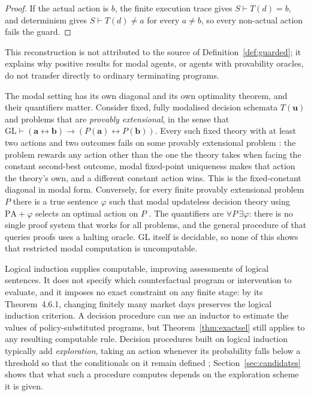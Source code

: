 \begin{proof}
If the actual action is $b$, the finite execution trace gives $S\vdash T(d)=b$, and determinism gives
$S\vdash T(d)\neq a$ for every $a\ne b$, so every non-actual action fails the guard.
\end{proof}

This reconstruction is not attributed to the source of Definition~\ref{def:guarded}; it explains
why positive results for modal agents, or agents with provability oracles, do not transfer directly
to ordinary terminating programs.

The modal setting has its own diagonal and its own optimality theorem, and their quantifiers matter.
Consider fixed, fully modalised decision schemata $T(\mathbf u)$ and problems that are \emph{provably
extensional}, in the sense that $\mathrm{GL}\vdash(\mathbf a\leftrightarrow\mathbf b)\to
(P(\mathbf a)\leftrightarrow P(\mathbf b))$. Every such fixed theory with at least two actions and
two outcomes fails on some provably extensional problem \autocite{fallenstein2014evil}: the problem
rewards any action other than the one the theory takes when facing the constant second-best outcome,
modal fixed-point uniqueness makes that action the theory's own, and a different constant action
wins. This is the fixed-constant diagonal in modal form. Conversely, for every finite provably
extensional problem $P$ there is a true sentence $\varphi$ such that modal updateless decision theory
using $\mathrm{PA}+\varphi$ selects an optimal action on $P$
\autocite{fallenstein2014optimality,fallenstein2014improving}. The quantifiers are
$\forall P\,\exists\varphi$: there is no single proof system that works for all problems, and the
general procedure of \textcite{soaresfallenstein2015} that queries proofs uses a halting oracle. $\mathrm{GL}$
itself is decidable, so none of this shows that restricted modal computation is uncomputable.

Logical induction \autocite{garrabrant2016li} supplies computable, improving assessments of logical
sentences. It does not specify which counterfactual program or intervention to evaluate, and it
imposes no exact constraint on any finite stage: by its Theorem~4.6.1, changing finitely many market
days preserves the logical induction criterion. A decision procedure can use an inductor to estimate
the values of policy-substituted programs, but Theorem~\ref{thm:exactsel} still applies to any
resulting computable rule. Decision procedures built on logical induction typically add
\emph{exploration}, taking an action whenever its probability falls below a threshold so that the
conditionals on it remain defined \autocite{garrabrant2017obstacles}; Section~\ref{sec:candidates}
shows that what such a procedure computes depends on the exploration scheme it is given.

